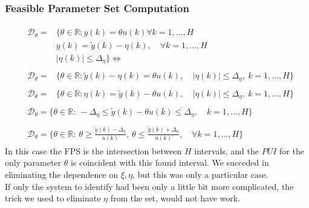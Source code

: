 \subsubsection{Feasible Parameter Set Computation}
{\large{
    \begin{align*}
        &\begin{aligned}
            \mathcal{D}_\theta = &\{
                \theta \in \mathbb{R}: y(k)=\theta u(k) \forall k=1,..., H \\
                &y(k)=\tilde{y}(k)-\eta(k), \quad \forall k=1,...,H\\
                &\vert \eta(k) \vert \le \Delta_\eta
            \}\Longleftrightarrow
        \end{aligned}\\ 
        &\begin{aligned}
            \mathcal{D}_\theta = &\{
                \theta \in \mathbb{R}: \tilde{y}(k)-\eta(k)=\theta u(k), \quad
                \vert \eta(k) \vert \le \Delta_\eta, \ 
                k=1,...,H 
            \}
        \end{aligned}\\
        &\begin{aligned}
            \mathcal{D}_\theta = &\{
                \theta \in \mathbb{R}: \eta(k)=\tilde{y}(k)-\theta u(k), \quad
                \vert \eta(k) \vert \le \Delta_\eta, \ 
                k=1,...,H 
            \}
        \end{aligned}\\
        &\begin{aligned}
            \mathcal{D}_\theta = \{
                \theta \in \mathbb{R}: \
                -\Delta_\eta \le \tilde{y}(k)-\theta u(k) \le \Delta_\eta, \quad
                k=1,...,H
            \}
        \end{aligned}\\
        &\begin{aligned}
            \mathcal{D}_\theta = \bigg\{
                \theta \in \mathbb{R}: \ 
                \theta \ge \frac{\tilde{y}(k)-\Delta_\eta}{u(k)}, \ \theta \le \frac{\tilde{y}(k)+\Delta_\eta}{u(k)}, \quad \forall k=1,...,H
            \bigg\}
        \end{aligned}
    \end{align*}
}}
In this case the FPS is the intersection between $H$ intervals, and the $PUI$ for the only parameter $\theta$ is coincident with this found interval.
We succeded in eliminating the dependence on $\xi,\eta$, but this was only  a particular case.\\
If only the system to identify had been only a little bit more complicated, the trick we used to eliminate $\eta$ from the set, would not have work. 

